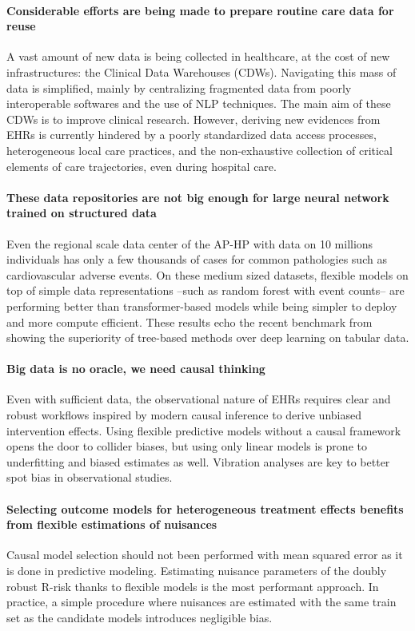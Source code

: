 \documentclass[french,12pt,twoside,a4paper]{book}
\begin{document}
\paragraph{Considerable efforts are being made to prepare routine care data for reuse}
A vast amount of new data is being collected in healthcare, at the cost of new
infrastructures: the Clinical Data Warehouses (CDWs). Navigating this mass of
data is simplified, mainly by centralizing fragmented data from poorly
interoperable softwares and the use of NLP techniques. The main aim of these
CDWs is to improve clinical research. However, deriving new evidences from EHRs
is currently hindered by a poorly standardized data access processes,
heterogeneous local care practices, and the non-exhaustive collection of
critical elements of care trajectories, even during hospital care.
%
\paragraph{These data repositories are not big enough for large neural network
  trained on structured data} Even the regional scale data center of the AP-HP
with data on 10 millions individuals has only a few thousands of cases for
common pathologies such as cardiovascular adverse events. On these medium
sized datasets, flexible models on top of simple data representations --such
as random forest with event counts-- are performing better than
transformer-based models while being simpler to deploy and more compute
efficient. These results echo the recent benchmark from
\cite{grinsztajn2022tree} showing the superiority of tree-based methods over
deep learning on tabular data.
%
\paragraph{Big data is no oracle, we need causal thinking} Even with sufficient
data, the observational nature of EHRs requires clear and robust workflows
inspired by modern causal inference to derive unbiased intervention effects.
Using flexible predictive models without a causal framework opens the door to
collider biases, but using only linear models is prone to underfitting and
biased estimates as well. Vibration analyses are key to better spot bias in
observational studies.

%
\paragraph{Selecting outcome models for heterogeneous treatment effects benefits
  from flexible estimations of nuisances} Causal model selection should not been
performed with mean squared error as it is done in predictive modeling.
Estimating nuisance parameters of the doubly robust R-risk thanks to flexible
models is the most performant approach. In practice, a simple procedure where
nuisances are estimated with the same train set as the candidate models
introduces negligible bias.
\end{document}
